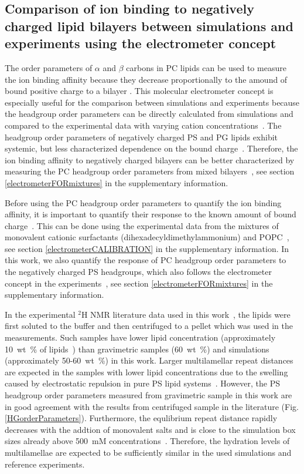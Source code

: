 \documentclass[aps,prl,superscriptaddress,twocolumn]{revtex4}
\begin{document}
\subsection{Comparison of ion binding to negatively charged lipid bilayers 
between simulations and experiments using the electrometer concept}

The order parameters of $\alpha$ and $\beta$ carbons in PC lipids
can be used to measure the ion binding affinity because they 
decrease proportionally to the amound of bound positive
charge to a bilayer \cite{akutsu81,altenbach84,seelig87}.
This molecular electrometer concept is especially useful for 
the comparison between simulations and experiments because
the headgroup order parameters can be directly calculated from 
simulations and compared to the experimental data with varying cation
concentrations~\cite{catte16}. The headgroup order parameters
of negatively charged PS and PG lipids exhibit systemic, but less
characterized dependence on the bound charge~\cite{borle85,macdonald87,roux86,roux90}.
Therefore, the ion binding affinity to negatively charged bilayers
can be better characterized by measuring the PC headgroup order parameters from 
mixed bilayers~\cite{roux86,roux90,roux91}, see section \ref{electrometerFORmixtures} in the supplementary information.

Before using the PC headgroup order parameters to quantify the ion binding
affinity, it is important to quantify their response to the known amount of bound charge~\cite{catte16,melcr18}.
This can be done using the experimental data from the mixtures of
monovalent cationic surfactants (dihexadecyldimethylammonium) and POPC~\cite{scherer89,melcr18},
see section \ref{electrometerCALIBRATION} in the supplementary information.
In this work, we also quantify the response of PC headgroup order parameters
to the negatively charged PS headgroups, which also follows the electrometer
concept in the experiments~\cite{scherer87},
see section \ref{electrometerFORmixtures} in the supplementary information.

In the experimental $^2$H NMR literature data used in this work~\cite{browning80,roux90},
the lipids were first soluted to the buffer and then centrifuged to a pellet which
was used in the measurements. Such samples have lower lipid concentration
(approximately 10~wt~\% of lipids~\cite{browning80,roux88,roux90}) than 
gravimetric samples (60~wt~\%) and simulations (approximately 50-60~wt~\%) in this work.
Larger multilamellar repeat distances are expected in the samples with lower lipid
concentrations due to the swelling caused by electrostatic repulsion in pure PS lipid systems~\cite{millman82}.
However, the PS headgroup order parameters measured from gravimetric sample in this work
are in good agreement with the results from centrifuged sample in the literature \cite{browning80} (Fig. \ref{HGorderParameters}).
Furthermore, the equlibrium repeat distance rapidly decreases with the addtion of monovalent
salts and is close to the simulation box sizes already above 500~mM concentrations~\cite{millman82,rand89}.
Therefore, the hydration levels of multilamellae are expected to be sufficiently similar
in the used simulations and reference experiments.
\end{document}
